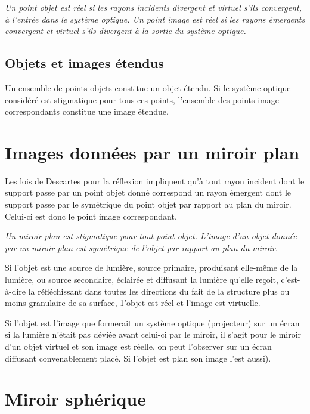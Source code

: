 \emph{Un point objet est réel si les rayons incidents divergent et virtuel 
s'ils convergent, à l'entrée dans le système optique. Un point image est réel 
si les rayons émergents convergent et virtuel s'ils divergent à la sortie du 
système optique.}%

\subsection{Objets et images étendus}%
\label{chap7-subsec:objetsimagesetendues}%

Un ensemble de points objets constitue un objet étendu. Si le système optique 
considéré est stigmatique pour tous ces points, l'ensemble des points image 
correspondants constitue une image étendue.


\section{Images données par un miroir plan}%
\label{chap7-sec:imagemiroirplan}%

Les lois de Descartes pour la réflexion impliquent qu'à tout rayon incident 
dont le support passe par un point objet donné correspond un rayon émergent 
dont le support passe par le symétrique du point objet par rapport au plan du 
miroir. Celui-ci est donc le point image correspondant.

\emph{Un miroir plan est stigmatique pour tout point objet. L'image d'un objet 
donnée par un miroir plan est symétrique de l'objet par rapport au plan du 
miroir.}%

Si l'objet est une source de lumière, source primaire, produisant elle-même de 
la lumière, ou source secondaire, éclairée et diffusant la lumière qu'elle 
reçoit, c'est-à-dire la réfléchissant dans toutes les directions du fait de la 
structure plus ou moins granulaire de sa surface, 1'objet est réel et l'image 
est virtuelle.

Si l'objet est l'image que formerait un système optique (projecteur) sur un 
écran si la lumière n'était pas déviée avant celui-ci par le miroir, il s'agit 
pour le miroir d'un objet virtuel et son image est réelle, on peut l'observer 
sur un écran diffusant convenablement placé. Si l'objet est plan son image 
l'est aussi).

\section{Miroir sphérique}%
\label{chap7-sec:miroirspherique}%

